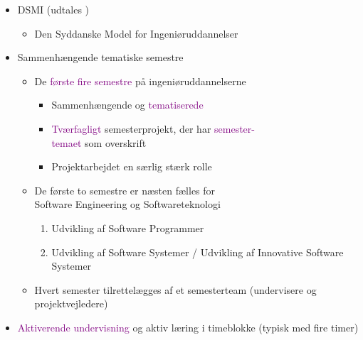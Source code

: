 {\begin{frame}[fragile]
  \vspace{0mm}
  \begin{itemize}
    \pause
    \item DSMI (udtales )
      \begin{itemize}
        \item Den Syddanske Model for Ingeniøruddannelser
      \end{itemize}
    \pause
    \item Sammenhængende tematiske semestre
      \begin{itemize}
        \item De \textcolor{purple}{første fire semestre} på ingeniøruddannelserne
          \begin{itemize}
            \item Sammenhængende og \textcolor{purple}{tematiserede}
            \item \textcolor{purple}{Tværfagligt} semesterprojekt, der har \textcolor{purple}{semester-}\\\textcolor{purple}{temaet} som overskrift
            \item Projektarbejdet en særlig stærk rolle
          \end{itemize}
        \item De første to semestre er næsten fælles for\\Software Engineering og Softwareteknologi
          \begin{enumerate}
            \item Udvikling af Software Programmer
            \item Udvikling af Software Systemer / Udvikling af Innovative Software Systemer
          \end{enumerate}
        \item Hvert semester tilrettelægges af et semesterteam (undervisere og projektvejledere)
      \end{itemize}
    \pause
    \item \textcolor{purple}{Aktiverende undervisning} og aktiv læring i timeblokke (typisk med fire timer)
  \end{itemize}
\end{frame}

}


